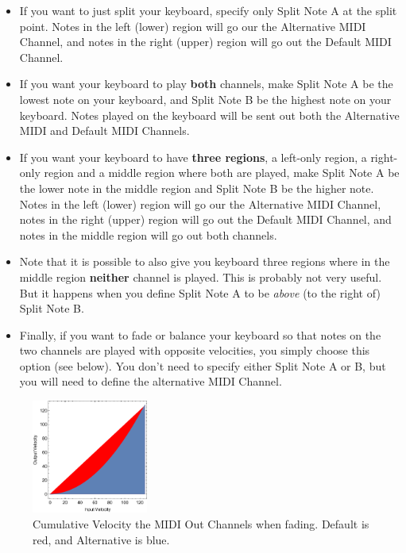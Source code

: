 \documentclass{article}
\begin{document}
\begin{itemize}
\item  If you want to just split your keyboard, specify only Split Note A at the split point.  Notes in the left (lower) region will go our the Alternative MIDI Channel, and notes in the right (upper) region will go out the Default MIDI Channel.

\item If you want your keyboard to play {\bf both} channels, make Split Note A be the lowest note on your keyboard, and Split Note B be the highest note on your keyboard.    Notes played on the keyboard will be sent out both the Alternative MIDI and Default MIDI Channels. 

\item If you want your keyboard to have {\bf three regions}, a left-only region, a right-only region and a middle region where both are played, make Split Note A be the lower note in the middle region and Split Note B be the higher note.   Notes in the left (lower) region will go our the Alternative MIDI Channel, notes in the right (upper) region will go out the Default MIDI Channel, and notes in the middle region will go out both channels.

\item Note that it is possible to also give you keyboard three regions where in the middle region {\bf neither} channel is played.  This is probably not very useful.  But it happens when you define Split Note A to be {\it above} (to the right of) Split Note B.

\item Finally, if you want to fade or balance your keyboard so that notes on the two channels are played with opposite velocities, you simply choose this option (see below).  You don't need to specify either Split Note A or B, but you will need to define the alternative MIDI Channel.
\end{itemize}

\begin{figure}
\vspace{-3em}\includegraphics[width=1.5in]{Fade}
\vspace{-2em}\caption{\small Cumulative Velocity the MIDI Out Channels when fading.  Default is {\color{red}red}, and Alternative is {\color{blue} blue}.}
\vspace{-3em}
\label{splitter}
\end{figure}
\end{document}

